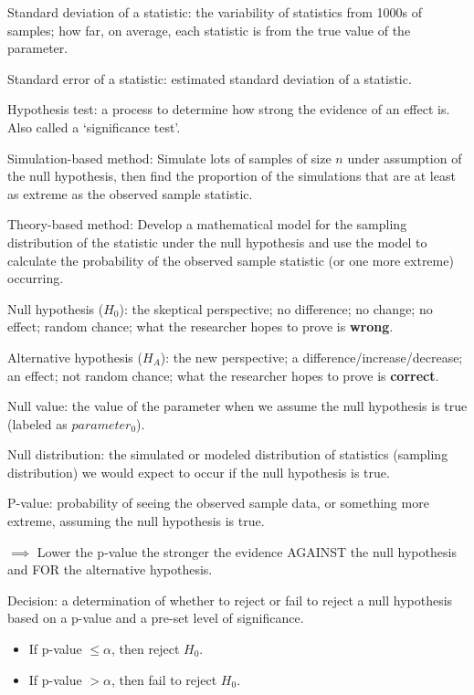 \documentclass[
]{report}
\begin{document}
Standard deviation of a statistic: the variability of statistics from 1000s of samples; how far, on average, each statistic is from the true value of the parameter.

Standard error of a statistic: estimated standard deviation of a statistic.

Hypothesis test: a process to determine how strong the evidence of an effect is. Also called a `significance test'.

Simulation-based method: Simulate lots of samples of size \(n\) under assumption of the null hypothesis, then find the proportion of the simulations that are at least as extreme as the observed sample statistic.

Theory-based method: Develop a mathematical model for the sampling distribution of the statistic under the null hypothesis and use the model to calculate the probability of the observed sample statistic (or one more extreme) occurring.

Null hypothesis (\(H_0\)): the skeptical perspective; no difference; no change; no effect; random chance; what the researcher hopes to prove is \textbf{wrong}.

Alternative hypothesis (\(H_A\)): the new perspective; a difference/increase/decrease; an effect; not random chance; what the researcher hopes to prove is \textbf{correct}.

Null value: the value of the parameter when we assume the null hypothesis is true (labeled as \(parameter_0\)).

Null distribution: the simulated or modeled distribution of statistics (sampling distribution) we would expect to occur if the null hypothesis is true.

P-value: probability of seeing the observed sample data, or something more extreme, assuming the null hypothesis is true.

\(\implies\) Lower the p-value the stronger the evidence AGAINST the null hypothesis and FOR the alternative hypothesis.

Decision: a determination of whether to reject or fail to reject a null hypothesis based on a p-value and a pre-set level of significance.

\begin{itemize}
\item
  If p-value \(\leq \alpha\), then reject \(H_0\).
\item
  If p-value \(> \alpha\), then fail to reject \(H_0\).
\end{itemize}
\end{document}
